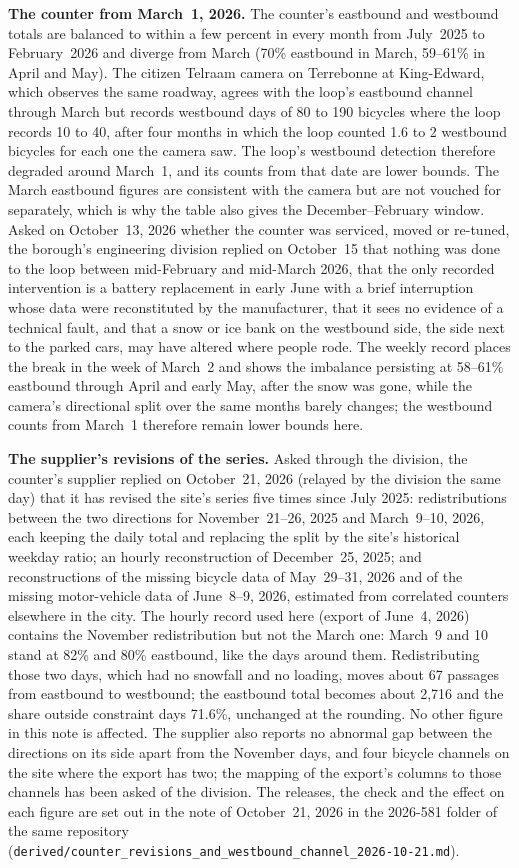 \documentclass[11pt,letterpaper]{article}
\begin{document}
\textbf{The counter from March~1, 2026.} The counter's eastbound and
westbound totals are balanced to within a few percent in every month from
July~2025 to February~2026 and diverge from March (70\% eastbound in
March, 59--61\% in April and May). The citizen Telraam camera on Terrebonne
at King-Edward, which observes the same roadway, agrees with the loop's
eastbound channel through March but records westbound days of 80 to 190
bicycles where the loop records 10 to 40, after four months in which the
loop counted 1.6 to 2 westbound bicycles for each one the camera saw. The
loop's westbound detection therefore degraded around March~1, and its
counts from that date are lower bounds. The March eastbound figures are
consistent with the camera but are not vouched for separately, which is
why the table also gives the December--February window. Asked on
October~13, 2026 whether the counter was serviced, moved or re-tuned, the
borough's engineering division replied on October~15 that nothing was done
to the loop between mid-February and mid-March 2026, that the only recorded
intervention is a battery replacement in early June with a brief
interruption whose data were reconstituted by the manufacturer, that it
sees no evidence of a technical fault, and that a snow or ice bank on the
westbound side, the side next to the parked cars, may have altered where
people rode. The weekly record places the break in the week of March~2 and
shows the imbalance persisting at 58--61\% eastbound through April and
early May, after the snow was gone, while the camera's directional split
over the same months barely changes; the westbound counts from March~1
therefore remain lower bounds here.

\textbf{The supplier's revisions of the series.} Asked through the
division, the counter's supplier replied on October~21, 2026 (relayed by
the division the same day) that it has revised the site's series five
times since July 2025: redistributions between the two directions for
November~21--26, 2025 and March~9--10, 2026, each keeping the daily total
and replacing the split by the site's historical weekday ratio; an hourly
reconstruction of December~25, 2025; and reconstructions of the missing
bicycle data of May~29--31, 2026 and of the missing motor-vehicle data of
June~8--9, 2026, estimated from correlated counters elsewhere in the city.
The hourly record used here (export of June~4, 2026) contains the November
redistribution but not the March one: March~9 and 10 stand at 82\% and 80\%
eastbound, like the days around them. Redistributing those two days, which
had no snowfall and no loading, moves about 67 passages from eastbound to
westbound; the eastbound total becomes about 2,716 and the share outside
constraint days 71.6\%, unchanged at the rounding. No other figure in this
note is affected. The supplier also reports no abnormal gap between the
directions on its side apart from the November days, and four bicycle
channels on the site where the export has two; the mapping of the export's
columns to those channels has been asked of the division. The releases,
the check and the effect on each figure are set out in the note of
October~21, 2026 in the 2026-581 folder of the same repository
(\texttt{derived/counter\_revisions\_and\_westbound\_channel\_2026-10-21.md}).
\end{document}
